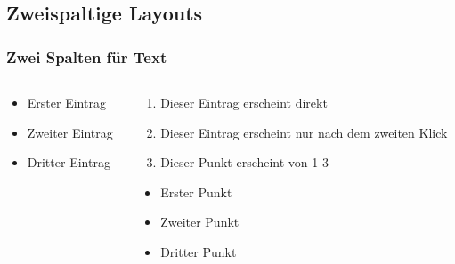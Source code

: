 \documentclass[9pt]{beamer}
\begin{document}
\subsection{Zweispaltige Layouts}
\begin{frame}
    \frametitle{Zwei Spalten für Text}
    \begin{columns}[T]
        \begin{column}{0.49\textwidth}
            \begin{itemize}[<+->] %
                \item Erster  Eintrag
                \item Zweiter Eintrag
			    \item Dritter Eintrag
		    \end{itemize}
        \end{column}
        \begin{column}{0.49\textwidth}
		    \begin{enumerate}
			    \item<1-> Dieser Eintrag erscheint direkt
                \item<2>  Dieser Eintrag erscheint nur nach dem zweiten Klick
                \item<1-3> Dieser Punkt erscheint von 1-3
          \end{enumerate}
          \begin{itemize}[<+->]
              \item Erster  Punkt
              \item Zweiter Punkt
              \item Dritter Punkt
          \end{itemize}
        \end{column}
    \end{columns}
\end{frame}
\end{document}
